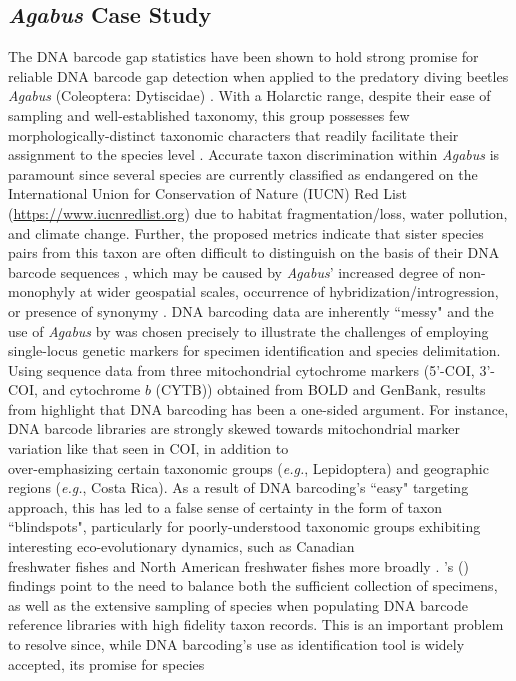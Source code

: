 \documentclass[12pt]{article}
\begin{document}
\begin{table}[H]
\begin{tabular}{cp{0.7\linewidth}}
    \hline
    \end{tabular}
\end{table}

\subsection{\textit{Agabus} Case Study}

The DNA barcode gap statistics have been shown to hold strong promise for reliable DNA barcode gap detection when applied to the predatory diving beetles \textit{Agabus} (Coleoptera: Dytiscidae) \citep{phillips2024measure}. With a Holarctic range, despite their ease of sampling and well-established taxonomy, this group possesses few morphologically-distinct taxonomic characters that readily facilitate their assignment to the species level \citep{bergsten2012effect}. Accurate taxon discrimination within \textit{Agabus} is paramount since several species are currently classified as endangered on the International Union for Conservation of Nature (IUCN) Red List (\href{https://www.iucnredlist.org}{https://www.iucnredlist.org}) due to habitat fragmentation/loss, water pollution, and climate change. Further, the proposed metrics indicate that sister species pairs from this taxon are often difficult to distinguish on the basis of their DNA barcode sequences \citep{phillips2024measure}, which may be caused by \textit{Agabus}' increased degree of non-monophyly at wider geospatial scales, occurrence of hybridization/introgression, or presence of synonymy \citep{bergsten2012effect}. DNA barcoding data are inherently ``messy" and the use of \textit{Agabus} by \citet{phillips2024measure} was chosen precisely to illustrate the challenges of employing single-locus genetic markers for specimen identification and species delimitation. Using sequence data from three mitochondrial cytochrome markers (5'-COI, 3'-COI, and cytochrome $b$ (CYTB)) obtained from BOLD and GenBank, results from \citet{phillips2024measure} highlight that DNA barcoding has been a one-sided argument. For instance, DNA barcode libraries are strongly skewed towards mitochondrial marker variation like that seen in COI, in addition to \\ over-emphasizing certain taxonomic groups (\textit{e.g.}, Lepidoptera) and geographic regions (\textit{e.g.}, Costa Rica). As a result of DNA barcoding's ``easy" targeting approach, this has led to a false sense of certainty in the form of taxon ``blindspots", particularly for poorly-understood taxonomic groups exhibiting interesting eco-evolutionary dynamics, such as Canadian \\ freshwater fishes \citep{hubert2008identifying, morey2024taxonomic} and North American freshwater fishes more broadly \citep{april2011genetic}. \citeauthor{phillips2024measure}'s (\citeyear{phillips2024measure}) findings point to the need to balance both the sufficient collection of specimens, as well as the extensive sampling of species when populating DNA barcode reference libraries with high fidelity taxon records. This is an important problem to resolve since, while DNA barcoding's use as identification tool is widely accepted, its promise for species 
\end{document}
